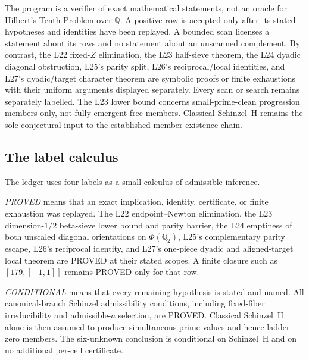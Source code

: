 \documentclass[11pt]{amsart}%
\newcommand{\Q}{\mathbb{Q}}
\begin{document}
The program is a verifier of exact mathematical statements, not an oracle
for Hilbert's Tenth Problem over $\Q$.  A positive row is accepted only
after its stated hypotheses and identities have been replayed.  A bounded
scan licenses a statement about its rows and no statement about an
unscanned complement.  By contrast, the L22 fixed-\(Z\) elimination,
the L23 half-sieve theorem, the L24 dyadic diagonal obstruction, L25's
parity split, L26's reciprocal/local identities, and L27's
dyadic/target character theorem are symbolic proofs or finite
exhaustions with their uniform arguments displayed separately.  Every
scan or search remains separately labelled.  The L23 lower bound
concerns small-prime-clean progression members only, not fully
emergent-free members.  Classical Schinzel~H remains the sole
conjectural input to the established member-existence chain.

\subsection{The label calculus}
The ledger uses four labels as a small calculus of admissible inference.

\emph{PROVED} means that an exact implication, identity, certificate, or
finite exhaustion was replayed.  The L22 endpoint--Newton elimination,
the L23 dimension-\(1/2\) beta-sieve lower bound and parity barrier, the
L24 emptiness of both unscaled diagonal orientations on \(\Phi(\Q_2)\),
L25's complementary parity escape, L26's reciprocal identity, and
L27's one-piece dyadic and aligned-target local theorem are PROVED at
their stated scopes.  A finite closure such as
$[179,[-1,1]]$ remains PROVED only for that row.

\emph{CONDITIONAL} means that every remaining hypothesis is stated and
named.  All canonical-branch Schinzel admissibility conditions, including
fixed-fiber irreducibility and admissible-$a$ selection, are PROVED.
Classical Schinzel~H alone is then assumed to produce simultaneous prime
values and hence ladder-zero members.  The six-unknown conclusion is
conditional on Schinzel~H and on no additional per-cell certificate.
\end{document}
